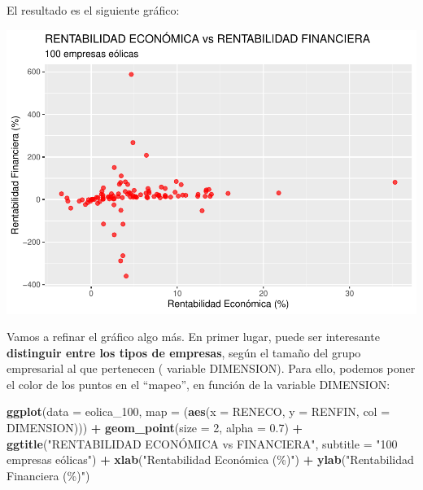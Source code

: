 \documentclass[
]{book}
\newenvironment{Shaded}{\begin{snugshade}}{\end{snugshade}}
\newcommand{\AttributeTok}[1]{\textcolor[rgb]{0.13,0.29,0.53}{#1}}
\newcommand{\DecValTok}[1]{\textcolor[rgb]{0.00,0.00,0.81}{#1}}
\newcommand{\FloatTok}[1]{\textcolor[rgb]{0.00,0.00,0.81}{#1}}
\newcommand{\FunctionTok}[1]{\textcolor[rgb]{0.13,0.29,0.53}{\textbf{#1}}}
\newcommand{\NormalTok}[1]{#1}
\newcommand{\SpecialCharTok}[1]{\textcolor[rgb]{0.81,0.36,0.00}{\textbf{#1}}}
\newcommand{\StringTok}[1]{\textcolor[rgb]{0.31,0.60,0.02}{#1}}
\let\Oldincludegraphics\includegraphics
\renewcommand{\includegraphics}[2][]{%
  \Oldincludegraphics[#1]{#2}%
}
\begin{document}
El resultado es el siguiente gráfico:

\includegraphics{_main_files/figure-latex/unnamed-chunk-118-1.pdf}

Vamos a refinar el gráfico algo más. En primer lugar, puede ser interesante \textbf{distinguir entre los tipos de empresas}, según el tamaño del grupo empresarial al que pertenecen ( variable DIMENSION). Para ello, podemos poner el color de los puntos en el ``mapeo'', en función de la variable DIMENSION:

\begin{Shaded}
\begin{Highlighting}[]
\FunctionTok{ggplot}\NormalTok{(}\AttributeTok{data =}\NormalTok{ eolica\_100, }\AttributeTok{map =}\NormalTok{ (}\FunctionTok{aes}\NormalTok{(}\AttributeTok{x =}\NormalTok{ RENECO,}
                                     \AttributeTok{y =}\NormalTok{ RENFIN,}
                                     \AttributeTok{col =}\NormalTok{ DIMENSION))) }\SpecialCharTok{+}
  \FunctionTok{geom\_point}\NormalTok{(}\AttributeTok{size =} \DecValTok{2}\NormalTok{, }\AttributeTok{alpha =} \FloatTok{0.7}\NormalTok{) }\SpecialCharTok{+}
  \FunctionTok{ggtitle}\NormalTok{(}\StringTok{"RENTABILIDAD ECONÓMICA vs FINANCIERA"}\NormalTok{,}
          \AttributeTok{subtitle =} \StringTok{"100 empresas eólicas"}\NormalTok{) }\SpecialCharTok{+}
  \FunctionTok{xlab}\NormalTok{(}\StringTok{"Rentabilidad Económica (\%)"}\NormalTok{) }\SpecialCharTok{+}
  \FunctionTok{ylab}\NormalTok{(}\StringTok{"Rentabilidad Financiera (\%)"}\NormalTok{)}
\end{Highlighting}
\end{Shaded}
\end{document}
